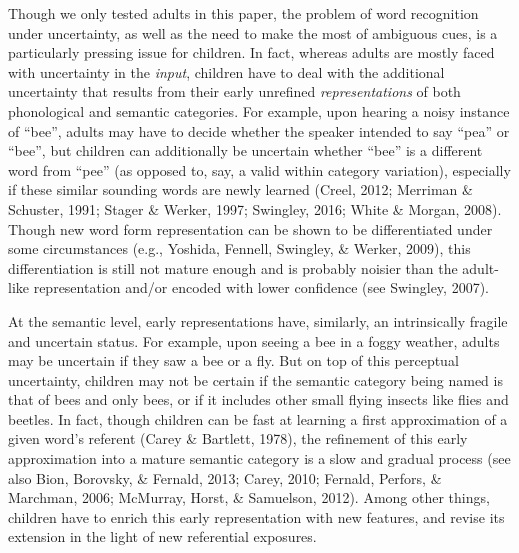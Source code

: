\documentclass[english,floatsintext,man]{apa6}
\theoremstyle{definition}
\theoremstyle{definition}
\theoremstyle{definition}
\theoremstyle{remark}
\begin{document}
Though we only tested adults in this paper, the problem of word
recognition under uncertainty, as well as the need to make the most of
ambiguous cues, is a particularly pressing issue for children. In fact,
whereas adults are mostly faced with uncertainty in the \emph{input},
children have to deal with the additional uncertainty that results from
their early unrefined \emph{representations} of both phonological and
semantic categories. For example, upon hearing a noisy instance of
\enquote{bee}, adults may have to decide whether the speaker intended to
say \enquote{pea} or \enquote{bee}, but children can additionally be
uncertain whether \enquote{bee} is a different word from \enquote{pee}
(as opposed to, say, a valid within category variation), especially if
these similar sounding words are newly learned (Creel, 2012; Merriman \&
Schuster, 1991; Stager \& Werker, 1997; Swingley, 2016; White \& Morgan,
2008). Though new word form representation can be shown to be
differentiated under some circumstances (e.g., Yoshida, Fennell,
Swingley, \& Werker, 2009), this differentiation is still not mature
enough and is probably noisier than the adult-like representation and/or
encoded with lower confidence (see Swingley, 2007).

At the semantic level, early representations have, similarly, an
intrinsically fragile and uncertain status. For example, upon seeing a
bee in a foggy weather, adults may be uncertain if they saw a bee or a
fly. But on top of this perceptual uncertainty, children may not be
certain if the semantic category being named is that of bees and only
bees, or if it includes other small flying insects like flies and
beetles. In fact, though children can be fast at learning a first
approximation of a given word's referent (Carey \& Bartlett, 1978), the
refinement of this early approximation into a mature semantic category
is a slow and gradual process (see also Bion, Borovsky, \& Fernald,
2013; Carey, 2010; Fernald, Perfors, \& Marchman, 2006; McMurray, Horst,
\& Samuelson, 2012). Among other things, children have to enrich this
early representation with new features, and revise its extension in the
light of new referential exposures.
\end{document}
